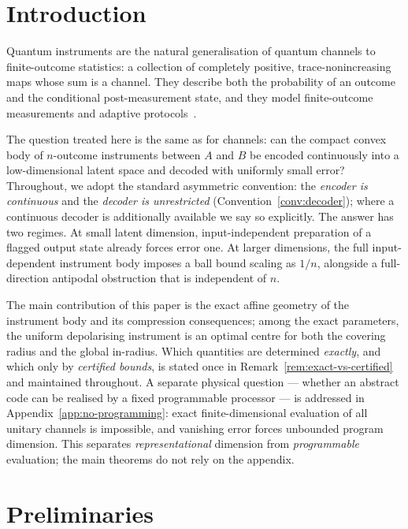 \documentclass[11pt,a4paper]{article}
\begin{document}
\tableofcontents

\section{Introduction}
\label{sec:intro}

Quantum instruments are the natural generalisation of quantum channels to finite-outcome statistics: a collection of completely positive, trace-nonincreasing maps whose sum is a channel. They describe both the probability of an outcome and the conditional post-measurement state, and they model finite-outcome measurements and adaptive protocols~\cite{DaviesLewis1970,Ozawa1984,ChiribellaEtAl2009Instruments}.

The question treated here is the same as for channels: can the compact convex body of $n$-outcome instruments between $A$ and $B$ be encoded continuously into a low-dimensional latent space and decoded with uniformly small error? Throughout, we adopt the standard asymmetric convention: the \emph{encoder is continuous} and the \emph{decoder is unrestricted} (Convention~\ref{conv:decoder}); where a continuous decoder is additionally available we say so explicitly. The answer has two regimes. At small latent dimension, input-independent preparation of a flagged output state already forces error one. At larger dimensions, the full input-dependent instrument body imposes a ball bound scaling as $1/n$, alongside a full-direction antipodal obstruction that is independent of $n$.

The main contribution of this paper is the exact affine geometry of the instrument body and its compression consequences; among the exact parameters, the uniform depolarising instrument is an optimal centre for both the covering radius and the global in-radius. Which quantities are determined \emph{exactly}, and which only by \emph{certified bounds}, is stated once in Remark~\ref{rem:exact-vs-certified} and maintained throughout. A separate physical question --- whether an abstract code can be realised by a fixed programmable processor --- is addressed in Appendix~\ref{app:no-programming}: exact finite-dimensional evaluation of all unitary channels is impossible, and vanishing error forces unbounded program dimension. This separates \emph{representational} dimension from \emph{programmable} evaluation; the main theorems do not rely on the appendix.

\section{Preliminaries}
\label{sec:prelim}
\end{document}
